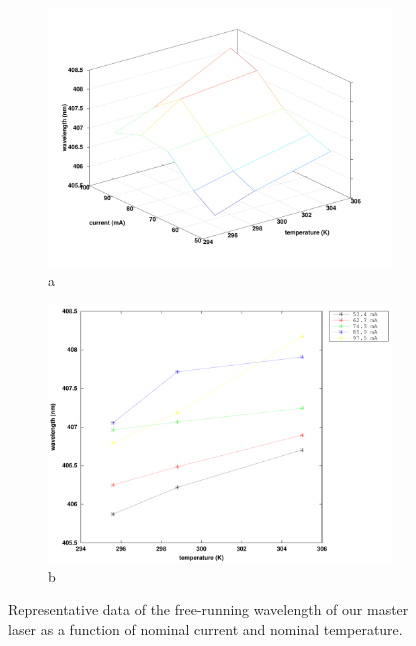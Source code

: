 \begin{figure}
\begin{subfigure}{0.5\textwidth}
\centering
\includegraphics[width=0.7\linewidth]{TVlambda3} 
\caption{a}
\label{currentandT:sfiga}
\end{subfigure}
\begin{subfigure}
\centering
\includegraphics[width=0.7\linewidth]{TVlambda2}
\caption{b}
\label{currentandT:sfigb}
\end{subfigure}
\caption[Graph of Temperatures and Currents]{\label{3dCurrentandTgraph} Representative data of the free-running wavelength of our master laser as a function of nominal current and nominal temperature.}
\end{figure}
